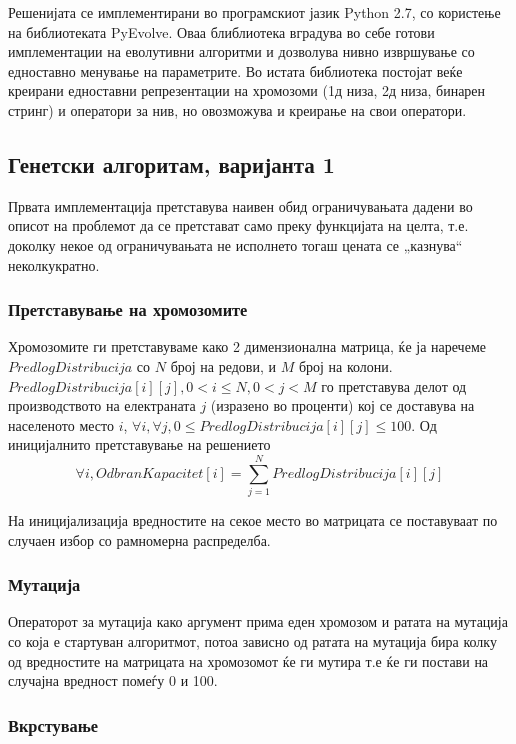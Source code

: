 \documentclass{article}
\begin{document}
Решенијата се имплементирани во програмскиот јазик Python 2.7, со користење на библиотеката PyEvolve. Оваа блиблиотека вградува во себе готови имплементации на еволутивни алгоритми и дозволува нивно извршување со едноставно менување на параметрите. Во истата библиотека постојат веќе креирани едноставни репрезентации на хромозоми (1д низа, 2д низа, бинарен стринг) и оператори за нив, но овозможува и креирање на свои оператори.

\subsection{Генетски алгоритам, варијанта 1}

Првата имплементација претставува наивен обид ограничувањата дадени во описот на проблемот да се претстават само преку функцијата на целта, т.е. доколку некое од ограничувањата не исполнето тогаш цената се „казнува“ неколкукратно. 

\subsubsection{Претставување на хромозомите}

Хромозомите ги претставуваме како 2 димензионална матрица, ќе ја наречеме $PredlogDistribucija$ со $N$ број на редови, и $M$ број на колони. $PredlogDistribucija[i][j], 0 < i \leq N, 0 < j < M$ го претставува делот од производството на електраната $j$ (изразено во проценти) кој се доставува на населеното место $i$, $ \forall i, \forall j, 0 \leq PredlogDistribucija[i][j] \leq 100$. Од иницијалнито претставување на решението 
\[ \forall i, OdbranKapacitet[i] = \sum_{j=1}^{N} PredlogDistribucija[i][j]\]

На иницијализација вредностите на секое место во матрицата се поставуваат по случаен избор со рамномерна распределба.

\subsubsection{Мутација}

Операторот за мутација како аргумент прима еден хромозом и ратата на мутација со која е стартуван алгоритмот, потоа зависно од ратата на мутација бира колку од вредностите на матрицата на хромозомот ќе ги мутира т.е ќе ги постави на случајна вредност помеѓу 0 и 100.
 
\subsubsection{Вкрстување}
\end{document}
